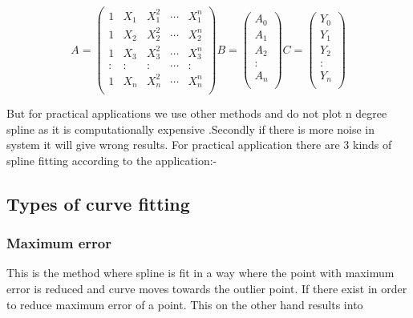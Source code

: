 \begin{equation}
A = 
\begin{pmatrix}
  1 & X_{1} & X_{1}^{2} & \cdots & X_{1}^{n} \\
  1 & X_{2} & X_{2}^{2} & \cdots & X_{2}^{n} \\
  1 & X_{3} & X_{3}^{2} & \cdots & X_{3}^{n} \\
  : & :     &     :     & \cdots &    :      \\
  1 & X_{n} & X_{n}^{2} & \cdots & X_{n}^{n} \\
 \end{pmatrix}
B = 
\begin{pmatrix}
  A_{0} \\
  A_{1} \\
  A_{2} \\
  : 	\\
  A_{n} \\
 \end{pmatrix}
 C = 
\begin{pmatrix}
  Y_{0} \\
  Y_{1} \\
  Y_{2} \\
  : 	\\
  Y_{n} \\
 \end{pmatrix}
\end{equation}

But for practical applications we use other methods and do not plot n degree spline as it is computationally expensive .Secondly if there is more noise in system it will give wrong results. 
For practical application there are 3 kinds of spline fitting according to the application:-

\subsection{Types of curve fitting}
\subsubsection{Maximum error}
This is the method where spline is fit in a way where the point with maximum error is reduced and curve moves towards the outlier point. If there exist in order to reduce maximum error of a point. This on the other hand results into

